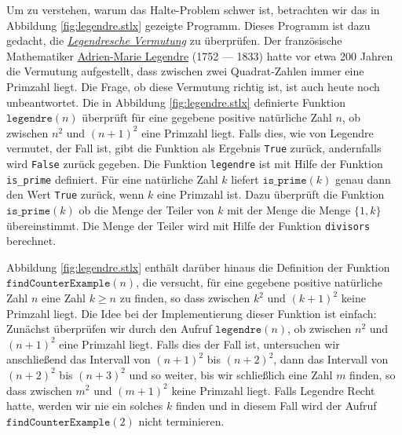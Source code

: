 Um zu verstehen, warum das Halte-Problem schwer ist, betrachten wir  
das in Abbildung \ref{fig:legendre.stlx} gezeigte Programm. 
Dieses Programm ist dazu gedacht, die
\href{http://de.wikipedia.org/wiki/Legendresche_Vermutung}{\emph{Legendresche Vermutung}} zu
überprüfen.  Der französische 
Mathematiker  \href{http://de.wikipedia.org/wiki/Adrien-Marie_Legendre}{Adrien-Marie Legendre} 
(1752 --- 1833) hatte vor etwa 200 Jahren die Vermutung 
aufgestellt, dass zwischen zwei Quadrat-Zahlen immer eine Primzahl liegt.  Die Frage, ob diese
Vermutung richtig ist, ist auch heute noch unbeantwortet.  Die in Abbildung \ref{fig:legendre.stlx}
definierte Funktion $\texttt{legendre}(n)$ überprüft für eine gegebene positive natürliche Zahl $n$,
ob zwischen $n^2$ und $(n+1)^2$ eine Primzahl liegt.  Falls dies, wie von Legendre vermutet, der
Fall ist, gibt die Funktion als Ergebnis \texttt{True} zurück, andernfalls wird \texttt{False}
zurück gegeben.  Die Funktion \texttt{legendre} ist mit Hilfe der Funktion \texttt{is\_prime} definiert.  Für
eine natürliche Zahl $k$ liefert $\texttt{is\_prime}(k)$ genau dann den Wert \texttt{True} zurück, wenn $k$
eine Primzahl ist.  Dazu überprüft die Funktion $\texttt{is\_prime}(k)$ ob die Menge der Teiler von $k$ mit der Menge
die Menge $\{1, k\}$ übereinstimmt.  Die Menge der Teiler wird mit Hilfe der Funktion \texttt{divisors} berechnet.

Abbildung \ref{fig:legendre.stlx} enthält darüber hinaus die Definition der Funktion
$\texttt{findCounterExample}(n)$, die versucht, für eine gegebene positive natürliche Zahl $n$ eine
Zahl $k \geq n$ zu finden, so dass zwischen $k^2$ und $(k+1)^2$ keine Primzahl liegt.  Die Idee bei
der Implementierung dieser Funktion ist einfach:  Zunächst überprüfen wir durch den Aufruf
$\texttt{legendre}(n)$, ob zwischen $n^2$ und $(n+1)^2$
eine Primzahl liegt.  Falls dies der Fall ist, untersuchen wir anschließend das Intervall von
$(n+1)^2$ bis $(n+2)^2$, dann das Intervall von 
$(n+2)^2$ bis $(n+3)^2$ und so weiter, bis wir schließlich eine Zahl $m$ finden, so dass zwischen
$m^2$ und $(m+1)^2$ keine Primzahl liegt.  Falls Legendre Recht hatte, werden wir nie ein solches
$k$ finden und in diesem Fall wird der Aufruf $\texttt{findCounterExample}(2)$ nicht terminieren. 

